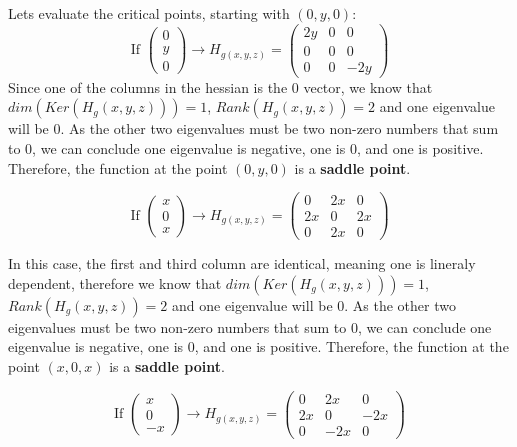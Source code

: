 \documentclass[12pt,twoside]{article}
\begin{document}
Lets evaluate the critical points, starting with $(0,y,0)$:
$$
    \text{If } \begin{pmatrix} 0 \\ y \\ 0 \end{pmatrix} \rightarrow 
    H_{g(x,y,z)} = \begin{pmatrix}
    2y & 0 & 0 \\
    0 & 0 & 0 \\
    0 & 0 & -2y
    \end{pmatrix}
$$
Since one of the columns in the hessian is the 0 vector, we know that $dim(Ker(H_g(x,y,z)))=1$, $Rank(H_g(x,y,z))=2$ and one eigenvalue will be 0. As the other two eigenvalues must be two non-zero numbers that sum to 0, we can conclude one eigenvalue is negative, one is 0, and one is positive. Therefore, the function at the point $(0,y,0)$ is a \textbf{saddle point}.

$$
    \text{If } \begin{pmatrix} x \\ 0 \\ x \end{pmatrix} \rightarrow 
    H_{g(x,y,z)} = \begin{pmatrix}
    0 & 2x & 0 \\
    2x & 0 & 2x \\
    0 & 2x & 0
    \end{pmatrix}
$$

In this case, the first and third column are identical, meaning one is lineraly dependent, therefore we know that $dim(Ker(H_g(x,y,z)))=1$, $Rank(H_g(x,y,z))=2$ and one eigenvalue will be 0. As the other two eigenvalues must be two non-zero numbers that sum to 0, we can conclude one eigenvalue is negative, one is 0, and one is positive. Therefore, the function at the point $(x,0,x)$ is a \textbf{saddle point}.

$$
    \text{If } \begin{pmatrix} x \\ 0 \\ -x \end{pmatrix} \rightarrow 
    H_{g(x,y,z)} = \begin{pmatrix}
    0 & 2x & 0 \\
    2x & 0 & -2x \\
    0 & -2x & 0
    \end{pmatrix}
$$
\end{document}
